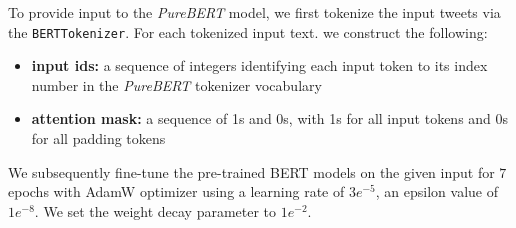 \documentclass[11pt,a4paper]{article}
\begin{document}
\newline
To provide input to the \textit{PureBERT} model, we first tokenize the input tweets via the \verb|BERTTokenizer|. For each tokenized input text.  we construct the following:
\begin{itemize}[noitemsep,topsep=2pt,parsep=0pt,partopsep=0pt]
    \item \textbf{input ids:} a sequence of integers identifying each input token to its index number in the \textit{PureBERT} tokenizer vocabulary
    \item \textbf{attention mask:} a sequence of 1s and 0s, with 1s for all input tokens and 0s for all padding tokens
\end{itemize}
We subsequently fine-tune the pre-trained BERT models on the given input for $7$ epochs with AdamW optimizer \citep{RN687} using a learning rate of $3e^{-5}$, an epsilon value of $1e^{-8}$. We set the weight decay parameter to $1e^{-2}$.
\end{document}
